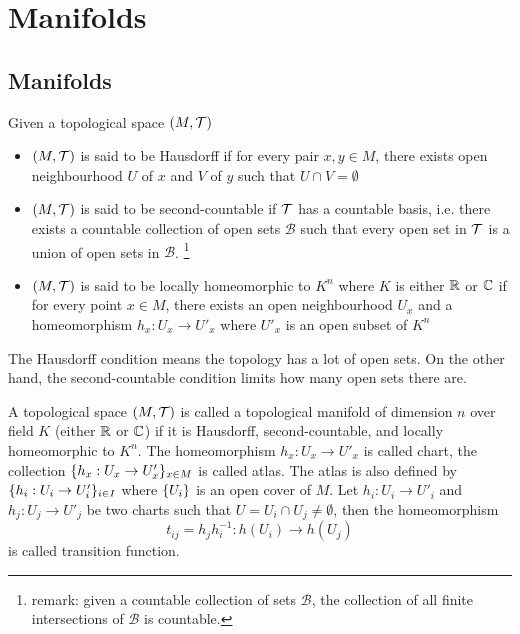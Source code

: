 \chapter{Manifolds}

\section{Manifolds}

\begin{definition}
	Given a topological space $(M, \mathcal{T})$
	\begin{itemize}
		
		\item $(M, \mathcal{T})$ is said to be Hausdorff if for every pair $x, y \in M$, there exists open neighbourhood $U$ of $x$ and $V$ of $y$ such that $U \cap V = \emptyset$
		
		\item $(M, \mathcal{T})$ is said to be second-countable if $\mathcal{T}$ has a countable basis, i.e. there exists a countable collection of open sets $\mathcal{B}$ such that every open set in $\mathcal{T}$ is a union of open sets in $\mathcal{B}$. \footnote{remark: given a countable collection of sets $\mathcal{B}$, the collection of all finite intersections of $\mathcal{B}$ is countable.}
		
		\item $(M, \mathcal{T})$ is said to be locally homeomorphic to $K^n$ where $K$ is either $\mathbb{R}$ or $\mathbb{C}$ if for every point $x \in M$, there exists an open neighbourhood $U_x$ and a homeomorphism $h_x: U_x \to U'_x$ where $U'_x$ is an open subset of $K^n$
		
	\end{itemize}
\end{definition}

\begin{remark}
	The Hausdorff condition means the topology has a lot of open sets. On the other hand, the second-countable condition limits how many open sets there are.
\end{remark}

\begin{definition}
	A topological space $(M, \mathcal{T})$ is called a topological manifold of dimension $n$ over field $K$ (either $\mathbb{R}$ or $\mathbb{C}$) if it is Hausdorff, second-countable, and locally homeomorphic to $K^n$. The homeomorphism $h_x: U_x \to U'_x$ is called chart, the collection $\{h_x: U_x \to U'_x\}_{x \in M}$ is called atlas. The atlas is also defined by $\{h_i: U_i \to U'_i\}_{i \in I}$ where $\{U_i\}$ is an open cover of $M$. Let $h_i: U_i \to U'_i$ and $h_j: U_j \to U'_j$ be two charts such that $U = U_i \cap U_j \neq \emptyset$, then the homeomorphism
	$$
	t_{ij} = h_j h_i^{-1}: h(U_i) \to h(U_j)
	$$
	is called transition function.
\end{definition}

